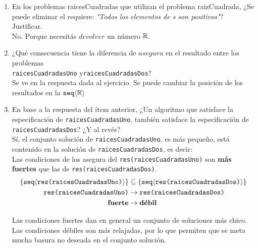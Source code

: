 \documentclass[12pt,a4paper,spanish]{article}
\begin{document}
\begin{enumerate}[label=\arabic*.]
	\item
	      En los problemas raicesCuadradas que utilizan el problema raizCuadrada, ¿Se puede eliminar el requiere:
	      \textit{"Todos los elementos de s son positivos"}? Justificar.  \\
	      \separadorCorto
	      No. Porque necesitás $devolver$ un número $\mathbb R$.

	\item
	      ¿Qué consecuencia tiene la diferencia de $asegura$ en el resultado entre los problemas\\
	      \texttt{raicesCuadradasUno} y\texttt{raicesCuadradasDos}?  \\
	      \separadorCorto
	      Se ve en la respuesta dada al ejercicio. Se puede cambiar la posición de los resultados en la $\texttt{seq} \langle \mathbb R \rangle$

	\item
	      En base a la respuesta del ítem anterior, ¿Un algoritmo que satisface la especificación de \texttt{raicesCuadradasUno}, también
	      satisface la especificación de \texttt{raicesCuadradasDos}? ¿Y al revés? \\
	      \separadorCorto
	      Sí, el conjunto solución de \texttt{raicesCuadradasUno}, es más pequeño, está contenido en la solución de \texttt{raicesCuadradasDos},
	      es decir:\\
	      Las condiciones de los asegura del \texttt{res(raicesCuadradasUno)} son \textbf{más fuertes} que las de \texttt{res(raicesCuadradasDos)}.
	      \begin{align*}
		      \left\{ \texttt{seq} \langle  \texttt{res(raicesCuadradasUno)} \rangle \right\} & \subseteq \left\{ \texttt{seq} \langle \texttt{res(raicesCuadradasDos)} \rangle \right\} \\
		      \texttt{res(raicesCuadradasUno)}              & \rightarrow \texttt{res(raicesCuadradasDos)}             \\
		      \textbf{fuerte}                               & \rightarrow \textbf{débil}
	      \end{align*}

	      Las condiciones fuertes dan en general un conjunto de soluciones más chico. Las condiciones débiles son más relajadas, por lo que permiten
	      que se meta mucha basura no deseada en el conjunto solución.


\end{enumerate}
\end{document}
